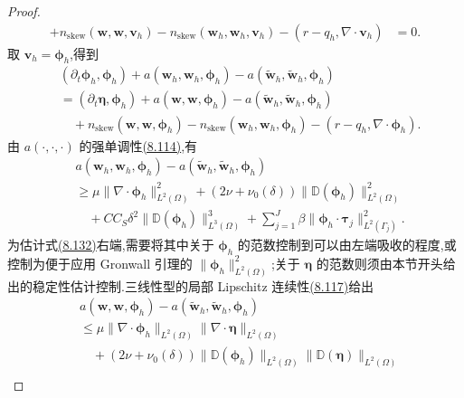\begin{lemma}[误差估计所需的微分不等式]
\begin{proof}
\begin{equation}
\begin{aligned}
  +n_{\mathrm{skew}}(\bm{w},\bm{w},\bm{v}_h)
  -n_{\mathrm{skew}}(\bm{w}_h,\bm{w}_h,\bm{v}_h)
  -(r-q_h,\nabla\cdot\bm{v}_h)&=0.
\end{aligned}
\end{equation}
取 $\bm{v}_h=\symbf{\phi}_h$,得到
\begin{equation}\label{eq:smagorinsky-error-equation-tested}
\begin{aligned}
 &(\partial_t\symbf{\phi}_h,\symbf{\phi}_h)
  +a(\bm{w}_h,\bm{w}_h,\symbf{\phi}_h)
  -a(\widetilde{\bm{w}}_h,\widetilde{\bm{w}}_h,\symbf{\phi}_h)\\
 &=(\partial_t\symbf{\eta},\symbf{\phi}_h)
  +a(\bm{w},\bm{w},\symbf{\phi}_h)
  -a(\widetilde{\bm{w}}_h,\widetilde{\bm{w}}_h,\symbf{\phi}_h)\\
 &\quad+n_{\mathrm{skew}}(\bm{w},\bm{w},\symbf{\phi}_h)
  -n_{\mathrm{skew}}(\bm{w}_h,\bm{w}_h,\symbf{\phi}_h)
  -(r-q_h,\nabla\cdot\symbf{\phi}_h).
\end{aligned}
\end{equation}
由 $a(\cdot,\cdot,\cdot)$ 的强单调性\hyperref[eq:smagorinsky-strain-strong-monotonicity]{(8.114)},有
\[
\begin{aligned}
 &a(\bm{w}_h,\bm{w}_h,\symbf{\phi}_h)
  -a(\widetilde{\bm{w}}_h,\widetilde{\bm{w}}_h,\symbf{\phi}_h)\\
 &\ge \mu\|\nabla\cdot\symbf{\phi}_h\|_{L^2(\Omega)}^2
  +(2\nu+\nu_0(\delta))\|\mathbb{D}(\symbf{\phi}_h)\|_{L^2(\Omega)}^2\\
 &\quad+C C_S\delta^2
       \|\mathbb{D}(\symbf{\phi}_h)\|_{L^3(\Omega)}^3
  +\sum_{j=1}^J\beta
       \|\symbf{\phi}_h\cdot\symbf{\tau}_j\|_{L^2(\Gamma_j)}^2.
\end{aligned}
\]
为估计式\hyperref[eq:smagorinsky-error-equation-tested]{(8.132)}右端,需要将其中关于 $\symbf{\phi}_h$ 的范数控制到可以由左端吸收的程度,或控制为便于应用 Gronwall 引理的 $\|\symbf{\phi}_h\|_{L^2(\Omega)}^2$;关于 $\symbf{\eta}$ 的范数则须由本节开头给出的稳定性估计控制.三线性型的局部 Lipschitz 连续性\hyperref[eq:smagorinsky-strain-local-lipschitz]{(8.117)}给出
\[
\begin{aligned}
 &a(\bm{w},\bm{w},\symbf{\phi}_h)
  -a(\widetilde{\bm{w}}_h,\widetilde{\bm{w}}_h,\symbf{\phi}_h)\\
 &\le \mu\|\nabla\cdot\symbf{\phi}_h\|_{L^2(\Omega)}
         \|\nabla\cdot\symbf{\eta}\|_{L^2(\Omega)}\\
 &\quad+(2\nu+\nu_0(\delta))
       \|\mathbb{D}(\symbf{\phi}_h)\|_{L^2(\Omega)}
       \|\mathbb{D}(\symbf{\eta})\|_{L^2(\Omega)}\\

\end{aligned}\]
\end{proof}
\end{lemma}
